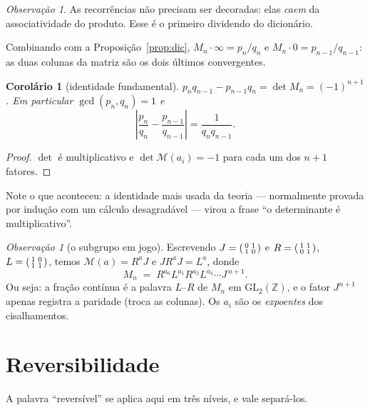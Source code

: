 \documentclass[11pt,a4paper]{article}
\theoremstyle{plain}
\newtheorem{corolario}[teorema]{Corolário}
\theoremstyle{definition}
\theoremstyle{remark}
\newtheorem{obs}[teorema]{Observação}
\newcommand{\Z}{\mathbb{Z}}
\newcommand{\Mat}[1]{\mathcal{M}(#1)}
\newcommand{\GL}{\mathrm{GL}}
\begin{document}
\begin{obs}
As recorrências não precisam ser decoradas: elas \emph{caem} da associatividade do produto.
Esse é o primeiro dividendo do dicionário.
\end{obs}

Combinando com a Proposição~\ref{prop:dic}, $M_n\cdot\infty = p_n/q_n$ e
$M_n\cdot 0 = p_{n-1}/q_{n-1}$: as duas colunas da matriz são os dois últimos convergentes.

\begin{corolario}[identidade fundamental]\label{cor:det}
$p_nq_{n-1}-p_{n-1}q_n = \det M_n = (-1)^{n+1}$. Em particular $\gcd(p_n,q_n)=1$ e
\[
  \left| \frac{p_n}{q_n} - \frac{p_{n-1}}{q_{n-1}} \right| = \frac{1}{q_nq_{n-1}} .
\]
\end{corolario}

\begin{proof}
$\det$ é multiplicativo e $\det\Mat{a_i}=-1$ para cada um dos $n+1$ fatores.
\end{proof}

Note o que aconteceu: a identidade mais usada da teoria --- normalmente provada por indução
com um cálculo desagradável --- virou a frase ``o determinante é multiplicativo''.

\begin{obs}[o subgrupo em jogo]
Escrevendo $J = \begin{psmallmatrix}0&1\\1&0\end{psmallmatrix}$ e
$R = \begin{psmallmatrix}1&1\\0&1\end{psmallmatrix}$,
$L = \begin{psmallmatrix}1&0\\1&1\end{psmallmatrix}$, temos $\Mat{a} = R^aJ$ e $JR^aJ = L^a$,
donde
\[
  M_n \;=\; R^{a_0}L^{a_1}R^{a_2}L^{a_3}\cdots J^{\,n+1}.
\]
Ou seja: a fração contínua é a palavra $L$--$R$ de $M_n$ em $\GL_2(\Z)$, e o fator $J^{n+1}$
apenas registra a paridade (troca as colunas). Os $a_i$ são os \emph{expoentes} dos cisalhamentos.
\end{obs}

\section{Reversibilidade}\label{sec:rev}

A palavra ``reversível'' se aplica aqui em três níveis, e vale separá-los.
\end{document}
